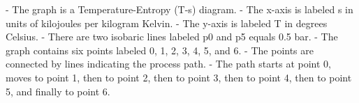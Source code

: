 - The graph is a Temperature-Entropy (T-s) diagram.
- The x-axis is labeled s in units of kilojoules per kilogram Kelvin.
- The y-axis is labeled T in degrees Celsius.
- There are two isobaric lines labeled p0 and p5 equals 0.5 bar.
- The graph contains six points labeled 0, 1, 2, 3, 4, 5, and 6.
- The points are connected by lines indicating the process path.
- The path starts at point 0, moves to point 1, then to point 2, then to point 3, then to point 4, then to point 5, and finally to point 6.
